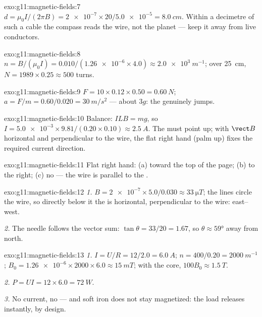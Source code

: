 \begin{solution}{exo:g11:magnetic-fields:7}
$d = \mu_0 I / (2\pi B) = \num{2e-7} \times 20 / \num{5.0e-5}
= \qty{8.0}{cm}$. Within a decimetre of such a cable the compass reads
the wire, not the planet --- keep it away from live conductors.
\end{solution}

\begin{solution}{exo:g11:magnetic-fields:8}
$n = B/(\mu_0 I) = 0.010 / (\num{1.26e-6} \times 4.0)
\approx \qty{2.0e3}{m^{-1}}$; over \qty{25}{cm},
$N = 1989 \times 0.25 \approx 500$ turns.
\end{solution}

\begin{solution}{exo:g11:magnetic-fields:9}
$F = 10 \times 0.12 \times 0.50 = \qty{0.60}{N}$;
$a = F/m = 0.60/0.020 = \qty{30}{m/s^2}$ --- about $3g$: the 
genuinely jumps.
\end{solution}

\begin{solution}{exo:g11:magnetic-fields:10}
Balance: $ILB = mg$, so
$I = \num{5.0e-3} \times 9.81 / (0.20 \times 0.10) \approx
\qty{2.5}{A}$. The  must point up; with $\vect B$ horizontal and
perpendicular to the wire, the flat right hand (palm up) fixes the
required current direction.
\end{solution}

\begin{solution}{exo:g11:magnetic-fields:11}
Flat right hand: (a) toward the top of the page; (b) to the right;
(c) no  --- the wire is parallel to the .
\end{solution}

\begin{solution}{exo:g11:magnetic-fields:12}
\emph{1.} $B = \num{2e-7} \times 5.0 / 0.030 \approx
\qty{33}{\micro T}$; the lines circle the wire, so directly below it
the  is horizontal, perpendicular to the wire: east--west.

\emph{2.} The needle follows the vector sum: $\tan\theta = 33/20 =
1.67$, so $\theta \approx \ang{59}$ away from north.
\end{solution}

\begin{solution}{exo:g11:magnetic-fields:13}
\emph{1.} $I = U/R = 12/2.0 = \qty{6.0}{A}$;
$n = 400/0.20 = \qty{2000}{m^{-1}}$;
$B_0 = \num{1.26e-6} \times 2000 \times 6.0 \approx \qty{15}{mT}$;
with the core, $100 B_0 \approx \qty{1.5}{T}$.

\emph{2.} $P = UI = 12 \times 6.0 = \qty{72}{W}$.

\emph{3.} No current, no  --- and soft iron does not stay
magnetized: the load releases instantly, by design.
\end{solution}

